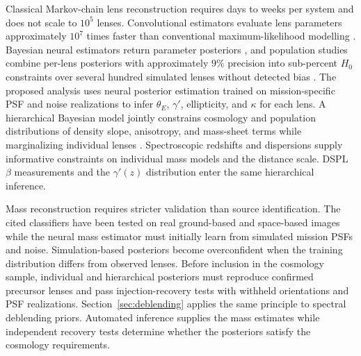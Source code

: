 Classical Markov-chain lens reconstruction requires days to weeks per system and does not scale to $10^5$ lenses. Convolutional estimators evaluate lens parameters approximately $10^7$ times faster than conventional maximum-likelihood modelling \cite{hezaveh2017}. Bayesian neural estimators return parameter posteriors \cite{perreaultlevasseur2017}, and population studies combine per-lens posteriors with approximately $9\%$ precision into sub-percent $H_0$ constraints over several hundred simulated lenses without detected bias \cite{park2021}. The proposed analysis uses neural posterior estimation trained on mission-specific PSF and noise realizations to infer $\theta_E$, $\gamma'$, ellipticity, and $\kappa$ for each lens. A hierarchical Bayesian model jointly constrains cosmology and population distributions of density slope, anisotropy, and mass-sheet terms while marginalizing individual lenses \cite{wagnercarena2021,legin2023}. Spectroscopic redshifts and dispersions supply informative constraints on individual mass models and the distance scale. DSPL $\beta$ measurements and the $\gamma'(z)$ distribution enter the same hierarchical inference.

Mass reconstruction requires stricter validation than source identification. The cited classifiers have been tested on real ground-based and space-based images while the neural mass estimator must initially learn from simulated mission PSFs and noise. Simulation-based posteriors become overconfident when the training distribution differs from observed lenses. Before inclusion in the cosmology sample, individual and hierarchical posteriors must reproduce confirmed precursor lenses and pass injection-recovery tests with withheld orientations and PSF realizations. Section~\ref{sec:deblending} applies the same principle to spectral deblending priors. Automated inference supplies the mass estimates while independent recovery tests determine whether the posteriors satisfy the cosmology requirements.

